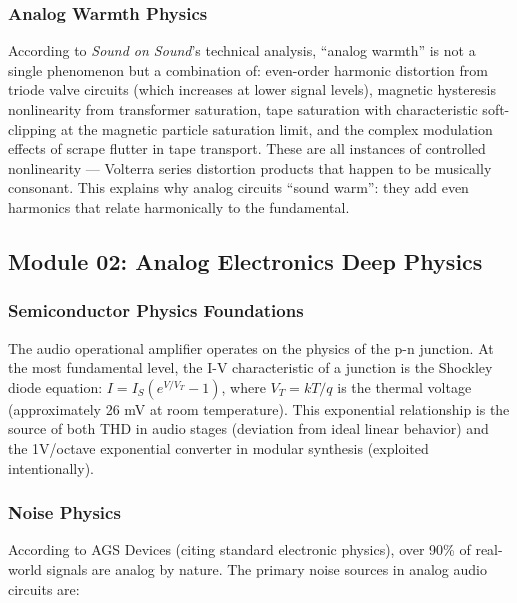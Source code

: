 \documentclass[11pt,letterpaper]{article}
\begin{document}
\subsubsection{Analog Warmth Physics}

According to \textit{Sound on Sound}'s technical analysis, ``analog warmth'' is not a single phenomenon but a combination of: even-order harmonic distortion from triode valve circuits (which increases at lower signal levels), magnetic hysteresis nonlinearity from transformer saturation, tape saturation with characteristic soft-clipping at the magnetic particle saturation limit, and the complex modulation effects of scrape flutter in tape transport. These are all instances of controlled nonlinearity --- Volterra series distortion products that happen to be musically consonant. This explains why analog circuits ``sound warm'': they add even harmonics that relate harmonically to the fundamental.

\subsection{Module 02: Analog Electronics Deep Physics}

\subsubsection{Semiconductor Physics Foundations}

The audio operational amplifier operates on the physics of the p-n junction. At the most fundamental level, the I-V characteristic of a junction is the Shockley diode equation: $I = I_S(e^{V/V_T} - 1)$, where $V_T = kT/q$ is the thermal voltage (approximately 26 mV at room temperature). This exponential relationship is the source of both THD in audio stages (deviation from ideal linear behavior) and the 1V/octave exponential converter in modular synthesis (exploited intentionally).

\subsubsection{Noise Physics}

According to AGS Devices (citing standard electronic physics), over 90\% of real-world signals are analog by nature. The primary noise sources in analog audio circuits are:
\end{document}
